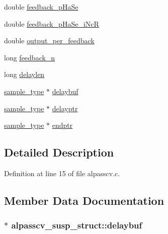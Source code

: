 \begin{DoxyCompactItemize}
double \hyperlink{structalpasscv__susp__struct_a726453b97deea795431758cfb1d03538}{feedback\+\_\+p\+Ha\+Se}
\item 
double \hyperlink{structalpasscv__susp__struct_a70914732369f10300366b44621dd3b1d}{feedback\+\_\+p\+Ha\+Se\+\_\+i\+NcR}
\item 
double \hyperlink{structalpasscv__susp__struct_a349757a5ff5165bd64fa714b1a5547ce}{output\+\_\+per\+\_\+feedback}
\item 
long \hyperlink{structalpasscv__susp__struct_a5fa20143b5d212ab2f7492baa7126a45}{feedback\+\_\+n}
\item 
long \hyperlink{structalpasscv__susp__struct_a8fcd0a98ec4ef24860b7421f2a47db47}{delaylen}
\item 
\hyperlink{sound_8h_a3a9d1d4a1c153390d2401a6e9f71b32c}{sample\+\_\+type} $\ast$ \hyperlink{structalpasscv__susp__struct_adb42b70e591ee1091ca04c8d4acb5b92}{delaybuf}
\item 
\hyperlink{sound_8h_a3a9d1d4a1c153390d2401a6e9f71b32c}{sample\+\_\+type} $\ast$ \hyperlink{structalpasscv__susp__struct_ac66a70ac40f5722cca7334e8f4568acf}{delayptr}
\item 
\hyperlink{sound_8h_a3a9d1d4a1c153390d2401a6e9f71b32c}{sample\+\_\+type} $\ast$ \hyperlink{structalpasscv__susp__struct_ab29e12b413da3f90f96a125a7129a061}{endptr}
\end{DoxyCompactItemize}


\subsection{Detailed Description}


Definition at line 15 of file alpasscv.\+c.



\subsection{Member Data Documentation}
\subsubsection[{\texorpdfstring{delaybuf}{delaybuf}}]{$\ast$ alpasscv\+\_\+susp\+\_\+struct\+::delaybuf}\hypertarget{structalpasscv__susp__struct_adb42b70e591ee1091ca04c8d4acb5b92}{}\label{structalpasscv__susp__struct_adb42b70e591ee1091ca04c8d4acb5b92}


